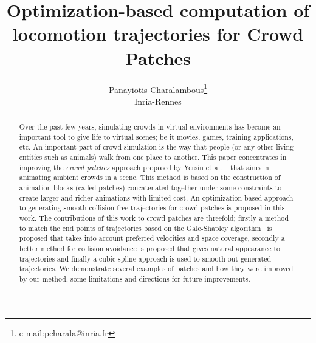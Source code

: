 \documentclass[review]{acmsiggraph}
\title{Optimization-based computation of locomotion trajectories for Crowd Patches}
\author{Panayiotis Charalambous\thanks{e-mail:pcharala@inria.fr}\\Inria-Rennes}
\begin{document}

\maketitle

\begin{abstract}

Over the past few years, simulating crowds in virtual environments has become an important tool to give life to virtual scenes; be it movies, games, training applications, etc.
An important part of crowd simulation is the way that people (or any other living entities such as animals) walk from one place to another.
This paper concentrates in improving the \emph{crowd patches} approach proposed by Yersin et al. ~\cite{Yersin:2009} that aims in animating ambient crowds in a scene.
This method is based on the construction of animation blocks (called patches) concatenated together under some constraints to create larger and richer animations with limited cost.
An optimization based approach to generating smooth collision free trajectories for crowd patches is proposed in this work.
The contributions of this work to crowd patches are threefold; firstly a method to match the end points of trajectories based on the Gale-Shapley algorithm~\cite{gale1962college} is proposed that takes into account preferred velocities and space coverage, secondly a better method for collision avoidance is proposed that gives natural appearance to trajectories and finally a cubic spline approach is used to smooth out generated trajectories.
We demonstrate several examples of patches and how they were improved by our method, some limitations and directions for future improvements.




\end{abstract}
\end{document}
